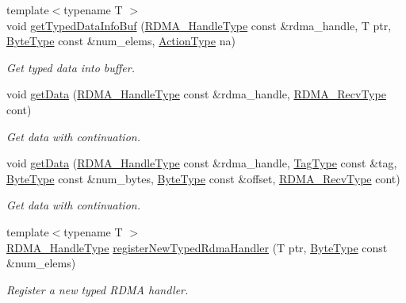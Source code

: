 \begin{DoxyCompactItemize}
{\footnotesize template$<$typename T $>$ }\\void \hyperlink{structvt_1_1rdma_1_1_r_d_m_a_manager_a59f4ee000f6c382289fa6c186962d1d1}{get\+Typed\+Data\+Info\+Buf} (\hyperlink{namespacevt_a10442579ec4e7ebef223818e64bcf908}{R\+D\+M\+A\+\_\+\+Handle\+Type} const \&rdma\+\_\+handle, T ptr, \hyperlink{namespacevt_aab8d55968084610ce3b17057981e9300}{Byte\+Type} const \&num\+\_\+elems, \hyperlink{namespacevt_ae0a5a7b18cc99d7b732cb4d44f46b0f3}{Action\+Type} na)
\begin{DoxyCompactList}\small\item\em Get typed data into buffer. \end{DoxyCompactList}\item 
void \hyperlink{structvt_1_1rdma_1_1_r_d_m_a_manager_aebefa1395f990efb66284adc1495f6d4}{get\+Data} (\hyperlink{namespacevt_a10442579ec4e7ebef223818e64bcf908}{R\+D\+M\+A\+\_\+\+Handle\+Type} const \&rdma\+\_\+handle, \hyperlink{namespacevt_1_1rdma_aa07fa86d8eca8853254b40fc0e565726}{R\+D\+M\+A\+\_\+\+Recv\+Type} cont)
\begin{DoxyCompactList}\small\item\em Get data with continuation. \end{DoxyCompactList}\item 
void \hyperlink{structvt_1_1rdma_1_1_r_d_m_a_manager_a214cf0d741a5dd197e12a3fcd6ea2c47}{get\+Data} (\hyperlink{namespacevt_a10442579ec4e7ebef223818e64bcf908}{R\+D\+M\+A\+\_\+\+Handle\+Type} const \&rdma\+\_\+handle, \hyperlink{namespacevt_a84ab281dae04a52a4b243d6bf62d0e52}{Tag\+Type} const \&tag, \hyperlink{namespacevt_aab8d55968084610ce3b17057981e9300}{Byte\+Type} const \&num\+\_\+bytes, \hyperlink{namespacevt_aab8d55968084610ce3b17057981e9300}{Byte\+Type} const \&offset, \hyperlink{namespacevt_1_1rdma_aa07fa86d8eca8853254b40fc0e565726}{R\+D\+M\+A\+\_\+\+Recv\+Type} cont)
\begin{DoxyCompactList}\small\item\em Get data with continuation. \end{DoxyCompactList}\item 
{\footnotesize template$<$typename T $>$ }\\\hyperlink{namespacevt_a10442579ec4e7ebef223818e64bcf908}{R\+D\+M\+A\+\_\+\+Handle\+Type} \hyperlink{structvt_1_1rdma_1_1_r_d_m_a_manager_a69d6fc1f017047de79f3c1190e55ac53}{register\+New\+Typed\+Rdma\+Handler} (T ptr, \hyperlink{namespacevt_aab8d55968084610ce3b17057981e9300}{Byte\+Type} const \&num\+\_\+elems)
\begin{DoxyCompactList}\small\item\em Register a new typed R\+D\+MA handler. \end{DoxyCompactList}\item 

\end{DoxyCompactItemize}
